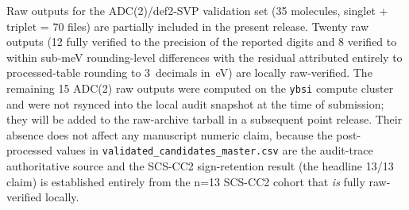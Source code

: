 \documentclass[journal=jcisd8,manuscript=article]{achemso}
\begin{document}
Raw outputs for the ADC(2)/def2-SVP validation set (35 molecules,
singlet + triplet = 70 files) are partially included in the present
release. Twenty raw outputs (12 fully verified to the precision of the
reported digits and 8 verified to within sub-meV rounding-level
differences with the residual attributed entirely to processed-table
rounding to 3~decimals in~eV) are locally raw-verified. The remaining 15 ADC(2) raw outputs
were computed on the \texttt{ybsi} compute cluster and were not rsynced
into the local audit snapshot at the time of submission; they will be
added to the raw-archive tarball in a subsequent point release. Their
absence does not affect any manuscript numeric claim, because the
post-processed values in \texttt{validated\_candidates\_master.csv}
are the audit-trace authoritative source and the SCS-CC2 sign-retention
result (the headline 13/13 claim) is established entirely from the
n=13 SCS-CC2 cohort that \emph{is} fully raw-verified locally.


\end{document}
